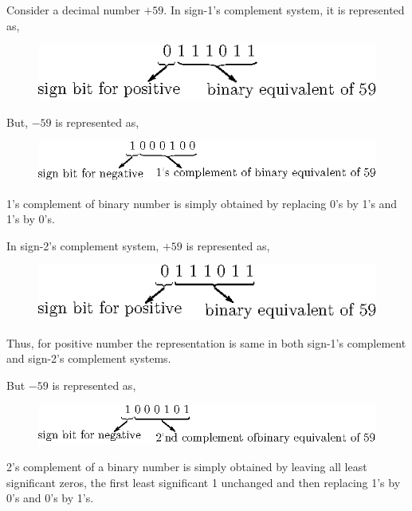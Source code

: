 Consider a decimal number $+59$. In sign-1's complement system, it is represented as,
\begin{figure}[H]
\centering
\includegraphics{chap5/div22.eps}
\end{figure}

But, $-59$ is represented as,
\begin{figure}[H]
\centering
\includegraphics{chap5/div23.eps}
\end{figure}

\begin{note}
1's complement of binary number is simply obtained by replacing 0's by 1's and 1's by 0's.
\end{note}

In sign-2's complement system, $+59$ is represented as,
\begin{figure}[H]
\centering
\includegraphics{chap5/div24.eps}
\end{figure}

Thus, for positive number the representation is same in both sign-1's complement and sign-2's complement systems.

But $-59$ is represented as,
\begin{figure}[H]
\centering
\includegraphics{chap5/div25.eps}
\end{figure}

\begin{note}
2's complement of a binary number is simply obtained by leaving all least significant zeros, the first least significant 1 unchanged and then replacing 1's by 0's and 0's by 1's.
\end{note}

